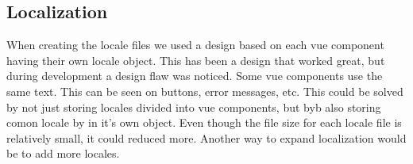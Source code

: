 \subsection{Localization}
When creating the locale files we used a design based on each vue component having their own locale object. This has been a design that worked great, but during development a design flaw was noticed. Some vue components use the same text. This can be seen on buttons, error messages, etc. This could be solved by not just storing locales divided into vue components, but byb also storing comon locale by in it's own object. Even though the file size for each locale file is relatively small, it could reduced more. Another way to expand localization would be to add more locales.
